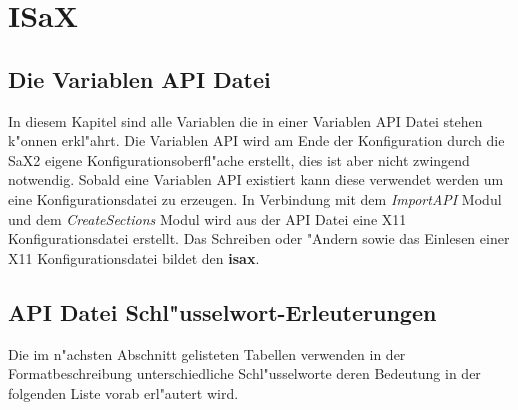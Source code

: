 \chapter{ISaX}
\label{cha:api}
\minitoc

\section{Die Variablen API Datei}
In diesem Kapitel sind alle Variablen die in einer Variablen 
API Datei stehen k"onnen erkl"ahrt. Die Variablen API wird am
Ende der Konfiguration durch die SaX2 eigene Konfigurationsoberfl"ache
erstellt, dies ist aber nicht zwingend notwendig. Sobald 
eine Variablen API existiert kann diese verwendet werden um 
eine Konfigurationsdatei zu erzeugen. In Verbindung mit dem 
\textit{ImportAPI} Modul und dem \textit{CreateSections} Modul
wird aus der API Datei eine X11 Konfigurationsdatei erstellt. Das
Schreiben oder "Andern sowie das Einlesen einer X11 Konfigurationsdatei
bildet den \textbf{isax}. 


\section{API Datei Schl"usselwort-Erleuterungen}
Die im n"achsten Abschnitt gelisteten Tabellen verwenden in der 
Formatbeschreibung unterschiedliche Schl"usselworte deren Bedeutung in der
folgenden Liste vorab erl"autert wird.

